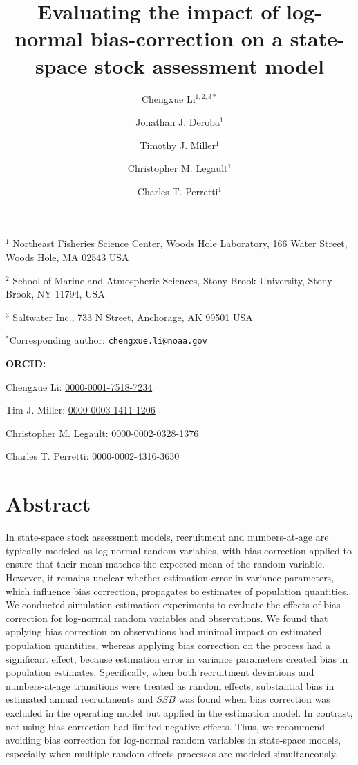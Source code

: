 \documentclass[
  12pt,
]{article}
\title{Evaluating the impact of log-normal bias-correction on a
state-space stock assessment model}
\author{Chengxue Li\(^{1,2,3*}\) \and Jonathan J.
Deroba\(^1\) \and Timothy J. Miller\(^1\) \and Christopher M.
Legault\(^1\) \and Charles T. Perretti\(^1\)}
\date{}
\begin{document}
\maketitle

\(^1\) Northeast Fisheries Science Center, Woods Hole Laboratory, 166
Water Street, Woods Hole, MA 02543 USA

\(^2\) School of Marine and Atmospheric Sciences, Stony Brook
University, Stony Brook, NY 11794, USA

\(^3\) Saltwater Inc., 733 N Street, Anchorage, AK 99501 USA

\(^*\)Corresponding author:
\href{mailto:chengxue.li@noaa.gov}{\nolinkurl{chengxue.li@noaa.gov}}

\vspace{0.5cm}

\textbf{ORCID:}

Chengxue Li:
\href{https://orcid.org/0000-0001-7518-7234}{0000-0001-7518-7234}

Tim J. Miller:
\href{https://orcid.org/0000-0003-1411-1206}{0000-0003-1411-1206}

Christopher M. Legault:
\href{https://orcid.org/0000-0002-0328-1376}{0000-0002-0328-1376}

Charles T. Perretti:
\href{https://orcid.org/0000-0002-4316-3630}{0000-0002-4316-3630}

\pagebreak

\hypertarget{abstract}{%
\section*{Abstract}\label{abstract}}

In state-space stock assessment models, recruitment and numbers-at-age
are typically modeled as log-normal random variables, with bias
correction applied to ensure that their mean matches the expected mean
of the random variable. However, it remains unclear whether estimation
error in variance parameters, which influence bias correction,
propagates to estimates of population quantities. We conducted
simulation-estimation experiments to evaluate the effects of bias
correction for log-normal random variables and observations. We found
that applying bias correction on observations had minimal impact on
estimated population quantities, whereas applying bias correction on the
process had a significant effect, because estimation error in variance
parameters created bias in population estimates. Specifically, when both
recruitment deviations and numbers-at-age transitions were treated as
random effects, substantial bias in estimated annual recruitments and
\(SSB\) was found when bias correction was excluded in the operating
model but applied in the estimation model. In contrast, not using bias
correction had limited negative effects. Thus, we recommend avoiding
bias correction for log-normal random variables in state-space models,
especially when multiple random-effects processes are modeled
simultaneously.
\end{document}
